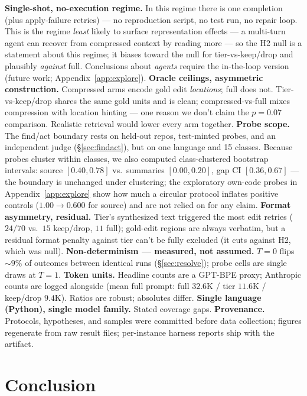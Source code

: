 \documentclass{article}
\newcommand{\ci}[2]{[#1, #2]}
\begin{document}
\textbf{Single-shot, no-execution regime.} In this regime there is one completion (plus
apply-failure retries) --- no reproduction script, no test run, no repair loop. This is the regime \emph{least} likely to
surface representation effects --- a multi-turn agent can recover from compressed context by
reading more --- so the H2 null is a statement about this regime; it biases toward the null for
tier-vs-keep/drop and plausibly \emph{against} full. Conclusions about \emph{agents} require the
in-the-loop version (future work; Appendix~\ref{app:explore}).
\textbf{Oracle ceilings, asymmetric construction.} Compressed arms encode gold edit
\emph{locations}; full does not. Tier-vs-keep/drop shares the same gold units and is clean;
compressed-vs-full mixes compression with location hinting --- one reason we don't claim the
$p{=}0.07$ comparison. Realistic retrieval would lower every arm together.
\textbf{Probe scope.} The find/act boundary rests on held-out repos, test-minted probes, and an
independent judge (\S\ref{sec:findact}), but on one language and 15 classes. Because probes
cluster within classes, we also computed class-clustered bootstrap intervals: source
$\ci{0.40}{0.78}$ vs.\ summaries $\ci{0.00}{0.20}$, gap CI $\ci{0.36}{0.67}$ --- the boundary is
unchanged under clustering; the exploratory
own-code probes in Appendix~\ref{app:explore} show how much a circular protocol inflates positive
controls ($1.00 \to 0.600$ for source) and are not relied on for any claim.
\textbf{Format asymmetry, residual.} Tier's synthesized text triggered the most edit retries
($24/70$ vs.\ $15$ keep/drop, $11$ full); gold-edit regions are always verbatim, but a residual
format penalty against tier can't be fully excluded (it cuts against H2, which was null).
\textbf{Non-determinism --- measured, not assumed.} $T{=}0$ flips ${\sim}9\%$ of outcomes between
identical runs (\S\ref{sec:resolve}); probe cells are single draws at $T{=}1$.
\textbf{Token units.} Headline counts are a GPT-BPE proxy; Anthropic counts are logged alongside
(mean full prompt: full $32.6$K / tier $11.6$K / keep/drop $9.4$K). Ratios are robust; absolutes
differ.
\textbf{Single language (Python), single model family.} Stated coverage gaps.
\textbf{Provenance.} Protocols, hypotheses, and samples were committed before data collection;
figures regenerate from raw result files; per-instance harness reports ship with the artifact.

\section{Conclusion}
\label{sec:conclusion}
\end{document}
